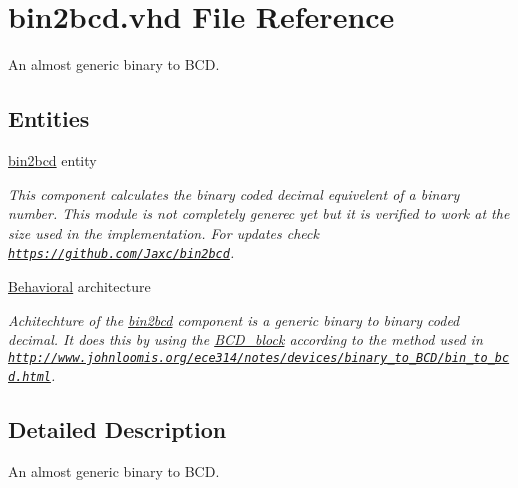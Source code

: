 \hypertarget{bin2bcd_8vhd}{\section{bin2bcd.\-vhd File Reference}
\label{bin2bcd_8vhd}
}


An almost generic binary to B\-C\-D.  


\subsection*{Entities}
\begin{DoxyCompactItemize}
\item 
\hyperlink{classbin2bcd}{bin2bcd} entity
\begin{DoxyCompactList}\small\item\em This component calculates the binary coded decimal equivelent of a binary number. This module is not completely generec yet but it is verified to work at the size used in the implementation. For updates check \href{https://github.com/Jaxc/bin2bcd}{\tt https\-://github.\-com/\-Jaxc/bin2bcd}. \end{DoxyCompactList}\item 
\hyperlink{classbin2bcd_1_1Behavioral}{Behavioral} architecture
\begin{DoxyCompactList}\small\item\em Achitechture of the \hyperlink{classbin2bcd}{bin2bcd}  component is a generic binary to binary coded decimal. It does this by using the \hyperlink{classBCD__block}{B\-C\-D\-\_\-block} according to the method used in \href{http://www.johnloomis.org/ece314/notes/devices/binary_to_BCD/bin_to_bcd.html}{\tt http\-://www.\-johnloomis.\-org/ece314/notes/devices/binary\-\_\-to\-\_\-\-B\-C\-D/bin\-\_\-to\-\_\-bcd.\-html}. \end{DoxyCompactList}\end{DoxyCompactItemize}


\subsection{Detailed Description}
An almost generic binary to B\-C\-D. 